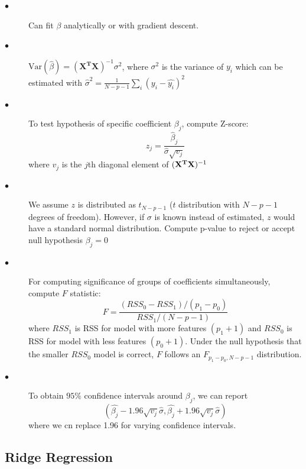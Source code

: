 \documentclass{article}
\begin{document}
\begin{description}

  \item[$\bullet$] Can fit $\beta$ analytically or with gradient descent. 
  
  \item[$\bullet$] $\text{Var}(\hat{\beta}) = (\boldsymbol{X^TX})^{-1}\sigma^2$, where $\sigma^2$ is the variance of $y_i$ which can be estimated with $\hat{\sigma}^2 = \frac{1}{N-p-1}\sum_i(y_i - \hat{y_i})^2$
  
  \item[$\bullet$] To test hypothesis of specific coefficient $\beta_j$, compute Z-score:
  \[z_j = \frac{\hat{\beta}_j}{\hat{\sigma}\sqrt{v_j}}\]
  where $v_j$ is the $j$th diagonal element of $\bold{(X^TX})^{-1}$
  
  \item[$\bullet$] We assume $z$ is distributed as $t_{N-p-1}$ ($t$ distribution with $N-p-1$ degrees of freedom). However, if $\sigma$ is known instead of estimated, $z$ would have a standard normal distribution. Compute p-value to reject or accept null hypothesis $\beta_j=0$
  
  \item[$\bullet$] For computing significance of groups of coefficients simultaneously, compute $F$ statistic:
  \[F = \frac{(RSS_0 - RSS_1)/(p_1 - p_0)}{RSS_1/(N-p-1)}\]
  where $RSS_1$ is RSS for model with more features $(p_1+1)$ and $RSS_0$ is RSS for model with less features $(p_0+1)$. Under the null hypothesis that the smaller $RSS_0$ model is correct, $F$ follows an $F_{p_1-p_0, N-p-1}$ distribution.
  
  \item[$\bullet$] To obtain $95\%$ confidence intervals around $\beta_j$, we can report
  \[(\hat{\beta_j}-1.96\sqrt{v_j}\hat{\sigma}, \hat{\beta_j}+1.96\sqrt{v_j}\hat{\sigma})\]
  where we cn replace 1.96 for varying confidence intervals.
\end{description}

\subsection{Ridge Regression}
\end{document}
